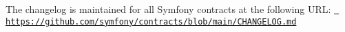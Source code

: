 The changelog is maintained for all Symfony contracts at the following URL\+: \href{https://github.com/symfony/contracts/blob/main/CHANGELOG.md}{\texttt{ https\+://github.\+com/symfony/contracts/blob/main/\+CHANGELOG.\+md}} 